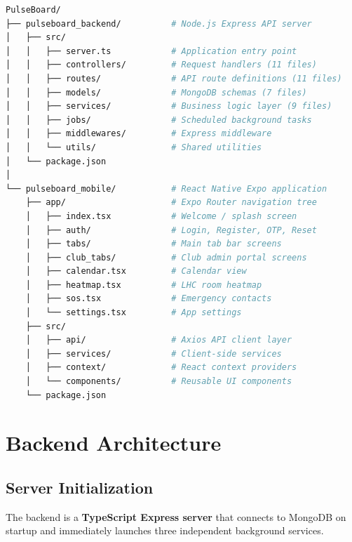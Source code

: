 \documentclass[12pt,a4paper]{report}
\begin{document}
\begin{lstlisting}[language=bash, caption={Repository Directory Structure}]
PulseBoard/
├── pulseboard_backend/          # Node.js Express API server
│   ├── src/
│   │   ├── server.ts            # Application entry point
│   │   ├── controllers/         # Request handlers (11 files)
│   │   ├── routes/              # API route definitions (11 files)
│   │   ├── models/              # MongoDB schemas (7 files)
│   │   ├── services/            # Business logic layer (9 files)
│   │   ├── jobs/                # Scheduled background tasks
│   │   ├── middlewares/         # Express middleware
│   │   └── utils/               # Shared utilities
│   └── package.json
│
└── pulseboard_mobile/           # React Native Expo application
    ├── app/                     # Expo Router navigation tree
    │   ├── index.tsx            # Welcome / splash screen
    │   ├── auth/                # Login, Register, OTP, Reset
    │   ├── tabs/                # Main tab bar screens
    │   ├── club_tabs/           # Club admin portal screens
    │   ├── calendar.tsx         # Calendar view
    │   ├── heatmap.tsx          # LHC room heatmap
    │   ├── sos.tsx              # Emergency contacts
    │   └── settings.tsx         # App settings
    ├── src/
    │   ├── api/                 # Axios API client layer
    │   ├── services/            # Client-side services
    │   ├── context/             # React context providers
    │   └── components/          # Reusable UI components
    └── package.json
\end{lstlisting}

\chapter{Backend Architecture}

\section{Server Initialization}

The backend is a \textbf{TypeScript Express server} that connects to MongoDB on startup and immediately launches three independent background services.
\end{document}
